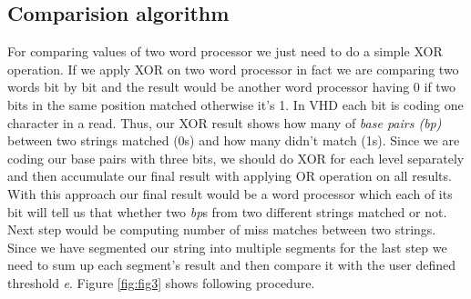\subsection{Comparision algorithm}
For comparing values of two word processor we just need to do a simple XOR operation. If we apply XOR on two word processor in fact we are comparing two words bit by bit and the result would be another word processor having 0 if two bits in the same position matched otherwise it's 1. In VHD each bit is coding one character in a read. Thus, our XOR result shows how many of \emph{base pairs (bp)} between two strings matched (0s) and how many didn't match (1s).
Since we are coding our base pairs with three bits, we should do XOR for each level separately and then accumulate our final result with applying OR operation  on all results. With this approach our final result would be a word processor which each of its bit will tell us that whether two \textit{bp}s from two different strings matched or not. Next step would be computing number of miss matches between two strings. Since we have segmented our string into multiple segments for the last step we need to sum up each segment's result and then compare it with the user defined threshold \textit{e}. Figure \ref{fig:fig3} shows following procedure.
  
\begin{figure}
\end{figure}